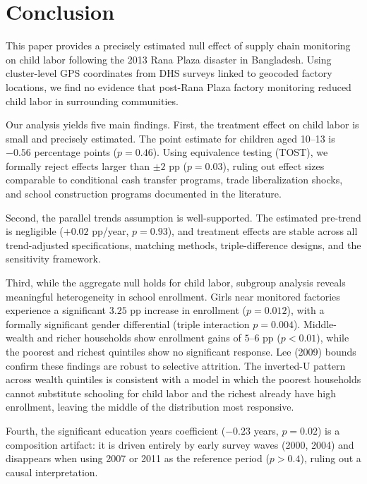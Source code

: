 \documentclass[12pt]{article}
\begin{document}
\section{Conclusion}

This paper provides a precisely estimated null effect of supply chain monitoring on child labor following the 2013 Rana Plaza disaster in Bangladesh. Using cluster-level GPS coordinates from DHS surveys linked to geocoded factory locations, we find no evidence that post-Rana Plaza factory monitoring reduced child labor in surrounding communities.

Our analysis yields five main findings. First, the treatment effect on child labor is small and precisely estimated. The point estimate for children aged 10--13 is $-0.56$ percentage points ($p = 0.46$). Using equivalence testing (TOST), we formally reject effects larger than $\pm 2$ pp ($p = 0.03$), ruling out effect sizes comparable to conditional cash transfer programs, trade liberalization shocks, and school construction programs documented in the literature.

Second, the parallel trends assumption is well-supported. The estimated pre-trend is negligible ($+0.02$ pp/year, $p = 0.93$), and treatment effects are stable across all trend-adjusted specifications, matching methods, triple-difference designs, and the \citet{RambachanRoth2023} sensitivity framework.

Third, while the aggregate null holds for child labor, subgroup analysis reveals meaningful heterogeneity in school enrollment. Girls near monitored factories experience a significant $3.25$ pp increase in enrollment ($p = 0.012$), with a formally significant gender differential (triple interaction $p = 0.004$). Middle-wealth and richer households show enrollment gains of $5$--$6$ pp ($p < 0.01$), while the poorest and richest quintiles show no significant response. Lee (2009) bounds confirm these findings are robust to selective attrition. The inverted-U pattern across wealth quintiles is consistent with a model in which the poorest households cannot substitute schooling for child labor and the richest already have high enrollment, leaving the middle of the distribution most responsive.

Fourth, the significant education years coefficient ($-0.23$ years, $p = 0.02$) is a composition artifact: it is driven entirely by early survey waves (2000, 2004) and disappears when using 2007 or 2011 as the reference period ($p > 0.4$), ruling out a causal interpretation.
\end{document}
